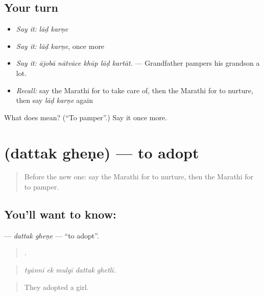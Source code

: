 \subsection*{Your turn}
\begin{itemize}
\raggedright
  \item \emph{Say it:} \emph{lāḍ karṇe}
  \item \emph{Say it:} \emph{lāḍ karṇe}, once more
  \item \emph{Say it:} \emph{ājobā nātvāce khūp lāḍ kartāt.} — Grandfather pampers his grandson a lot.
  \item \emph{Recall:} say the Marathi for to take care of, then the Marathi for to nurture, then say \emph{lāḍ karṇe} again
\end{itemize}

\begin{tcolorbox}[breakable,colback=teal!4,colframe=teal!35!black,title={Before you move on}]
What does   mean? (\textquotedblleft{}To pamper\textquotedblright{}.) Say it once more.
\end{tcolorbox}
\section[\texorpdfstring{\mr{दत्तक} \mr{घेणे} (dattak gheṇe)}{दत्तक घेणे (dattak gheṇe)}]{  (dattak gheṇe) — to adopt}

\label{lesson:MR-C500-dattak-ghene}



\begin{quote}
Before the new one: say the Marathi for to nurture, then the Marathi for to pamper.
\end{quote}

\subsection*{You'll want to know:  }
\textbf{ } — \emph{dattak gheṇe} — \textquotedblleft{}to adopt\textquotedblright{}.

\begin{quote}
    .
\end{quote}

\begin{quote}
\emph{tyānnī ek mulgī dattak ghetlī.}
\end{quote}

\begin{quote}
They adopted a girl.
\end{quote}

